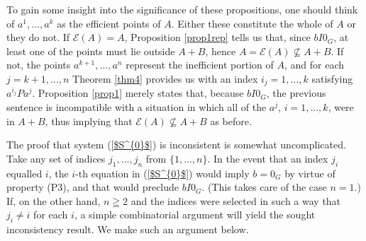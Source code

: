 \documentclass[pdflatex,sn-apa,11pt]{sn-jnl}%
\begin{document}
To gain some insight into the significance of these propositions, one should think of $a^1, ..., a^{k}$ as the efficient points of $A$. Either these constitute the whole of $A$ or they do not. If $\mathscr{E}(A) = A$, Proposition \ref{prop1rep} tells us that, since $bI0_{G}$, at least one of the points must lie outside $A+B$, hence $A = \mathscr{E}(A) \not \subseteq A+B$. If not, the points $a^{k+1}, ..., a^{n}$ represent the inefficient portion of $A$, and for each $j = k+1, ..., n$ Theorem \ref{thm4} provides us with an index $i_j = 1, ..., k$ satisfying $a^{i_j}Pa^{j}$. Proposition \ref{prop1} merely states that, because $bI0_{G}$, the previous sentence is incompatible with a situation in which all of the $a^{j}$, $i = 1, ..., k$, were in $A+B$, thus implying that $\mathscr{E}(A) \not \subseteq A+B$ as before.  

The proof that system (\ref{$S^{0}$}) is inconsistent is somewhat uncomplicated. Take any set of indices $j_1, ..., j_n$ from $\{1, ..., n\}$. In the event that an index $j_i$ equalled $i$, the $i$-th equation in (\ref{$S^{0}$}) would imply $b = 0_{G}$ by virtue of property (P3), and that would preclude $bI0_{G}$. (This takes care of the case $n = 1$.) If, on the other hand, $n \geqq 2$ and the indices were selected in such a way that $j_i \neq i$ for each $i$, a simple combinatorial argument will yield the sought inconsistency result. We make such an argument below.
\end{document}
